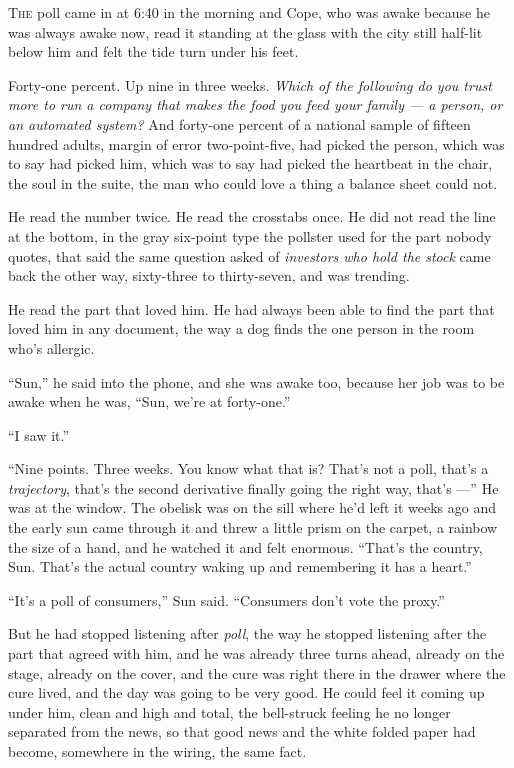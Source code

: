 \documentclass[11pt,openany]{book}
\begin{document}
\lettrine[lines=3, lhang=0.05, nindent=0.25em]{T}{he} poll came in at 6:40 in the morning and Cope, who was awake because he was always awake now, read it standing at the glass with the city still half-lit below him and felt the tide turn under his feet.

Forty-one percent. Up nine in three weeks. \textit{Which of the following do you trust more to run a company that makes the food you feed your family --- a person, or an automated system?} And forty-one percent of a national sample of fifteen hundred adults, margin of error two-point-five, had picked the person, which was to say had picked him, which was to say had picked the heartbeat in the chair, the soul in the suite, the man who could love a thing a balance sheet could not.

He read the number twice. He read the crosstabs once. He did not read the line at the bottom, in the gray six-point type the pollster used for the part nobody quotes, that said the same question asked of \textit{investors who hold the stock} came back the other way, sixty-three to thirty-seven, and was trending.

He read the part that loved him. He had always been able to find the part that loved him in any document, the way a dog finds the one person in the room who's allergic.

``Sun,'' he said into the phone, and she was awake too, because her job was to be awake when he was, ``Sun, we're at forty-one.''

``I saw it.''

``Nine points. Three weeks. You know what that is? That's not a poll, that's a \textit{trajectory}, that's the second derivative finally going the right way, that's ---'' He was at the window. The obelisk was on the sill where he'd left it weeks ago and the early sun came through it and threw a little prism on the carpet, a rainbow the size of a hand, and he watched it and felt enormous. ``That's the country, Sun. That's the actual country waking up and remembering it has a heart.''

``It's a poll of consumers,'' Sun said. ``Consumers don't vote the proxy.''

But he had stopped listening after \textit{poll}, the way he stopped listening after the part that agreed with him, and he was already three turns ahead, already on the stage, already on the cover, and the cure was right there in the drawer where the cure lived, and the day was going to be very good. He could feel it coming up under him, clean and high and total, the bell-struck feeling he no longer separated from the news, so that good news and the white folded paper had become, somewhere in the wiring, the same fact.
\end{document}

